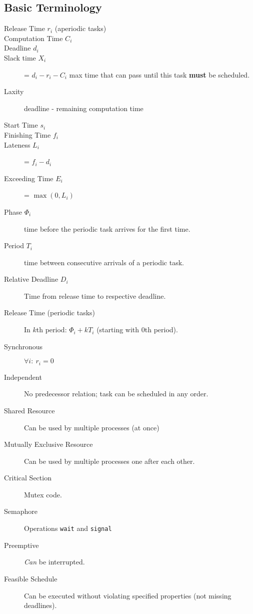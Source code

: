 \subsection{Basic Terminology}
\begin{description}
	\item[Release Time $r_i$ (aperiodic tasks)]
	\item[Computation Time $C_i$]
	\item[Deadline $d_i$]
	\item[Slack time $X_i$] = $d_i - r_i - C_i$ max time that can pass until
	this task \textbf{must} be scheduled.
	\item[Laxity] deadline - remaining computation time
	\item[Start Time $s_i$]
	\item[Finishing Time $f_i$]
	\item[Lateness $L_i$] = $f_i - d_i$
	\item[Exceeding Time $E_i$] = $\max(0, L_i)$
	\item[Phase $\Phi_i$] time before the periodic task arrives for the first
	time.
	\item[Period $T_i$] time between consecutive arrivals of a periodic task.
	\item[Relative Deadline $D_i$] Time from release time to respective deadline.
	\item[Release Time (periodic tasks)] In $k$th period: $\Phi_i + k T_i$
	(starting with 0th period).
	\item[Synchronous] $\forall i: \ r_i = 0$
	\item[Independent] No predecessor relation; task can be scheduled in any
	order.
	\item[Shared Resource] Can be used by multiple processes (at once)
	\item[Mutually Exclusive Resource]Can be used by multiple processes one
	after each other.
	\item[Critical Section] Mutex code.
	\item[Semaphore] Operations \texttt{wait} and \texttt{signal}
	\item[Preemptive] \textit{Can} be interrupted.
	\item[Feasible Schedule] Can be executed without violating specified
	properties (\eg not missing deadlines).
\end{description}

